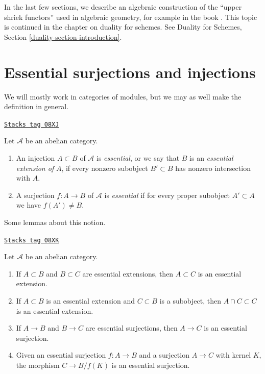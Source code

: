 \medskip\noindent
In the last few sections, we describe an algebraic construction of
the ``upper shriek functors'' used in algebraic geometry, for example
in the book \cite{RD}. This topic is continued in the chapter on
duality for schemes. See
Duality for Schemes, Section \ref{duality-section-introduction}.

\section{Essential surjections and injections}
\label{dualizing-section-essential}
We will mostly work in categories of modules, but we may as well make
the definition in general.

\begin{definition}[Essential]
\label{dualizing-definition-essential}
\href{https://stacks.math.columbia.edu/tag/08XJ}{\texttt{Stacks tag 08XJ}}

Let $\mathcal{A}$ be an abelian category.
\begin{enumerate}
\item An injection $A \subset B$ of $\mathcal{A}$ is {\it essential},
or we say that $B$ is an {\it essential extension of} $A$,
if every nonzero subobject $B' \subset B$ has nonzero intersection with $A$.
\item A surjection $f : A \to B$ of $\mathcal{A}$ is {\it essential}
if for every proper subobject $A' \subset A$ we have $f(A') \not = B$.
\end{enumerate}
\end{definition}

Some lemmas about this notion.

\begin{lemma}[Essential]
\label{dualizing-lemma-essential}
\href{https://stacks.math.columbia.edu/tag/08XK}{\texttt{Stacks tag 08XK}}

Let $\mathcal{A}$ be an abelian category.
\begin{enumerate}
\item If $A \subset B$ and $B \subset C$ are essential extensions, then
$A \subset C$ is an essential extension.
\item If $A \subset B$ is an essential extension and $C \subset B$
is a subobject, then $A \cap C \subset C$ is an essential extension.
\item If $A \to B$ and $B \to C$ are essential surjections, then
$A \to C$ is an essential surjection.
\item Given an essential surjection $f : A \to B$ and a surjection
$A \to C$ with kernel $K$, the morphism $C \to B/f(K)$ is an essential
surjection.
\end{enumerate}
\end{lemma}

